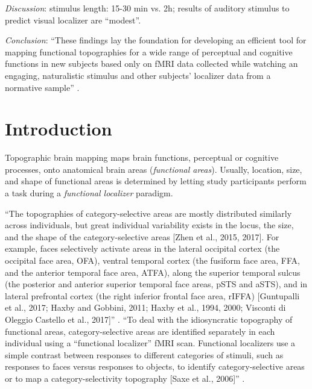 %
\textit{Discussion}: stimulus length: 15-30 min vs. 2h;  results of auditory stimulus to predict visual localizer are ``modest''.

%
\textit{Conclusion}: ``These findings lay the foundation for developing an
efficient tool for mapping functional topographies for a wide range of
perceptual and cognitive functions in new subjects based only on fMRI data
collected while watching an engaging, naturalistic stimulus and other subjects'
localizer data from a normative sample'' \citep{jiahui2020predicting}.


\section{Introduction}



Topographic brain mapping maps brain functions, perceptual or cognitive
processes, onto anatomical brain areas (\textit{functional areas}).
Usually, location, size, and shape of functional areas is determined by letting
study participants perform a task during a \textit{functional localizer}
paradigm.

``The topographies of category-selective areas are mostly distributed similarly
across individuals, but great individual variability exists in the locus, the
size, and the shape of the category-selective areas [Zhen et al., 2015, 2017].
For example, faces selectively activate areas in the lateral occipital cortex
(the occipital face area, OFA), ventral temporal cortex (the fusiform face area,
FFA, and the anterior temporal face area, ATFA), along the superior temporal
sulcus (the posterior and anterior superior temporal face areas, pSTS and aSTS),
and in lateral prefrontal cortex (the right inferior frontal face area, rIFFA)
[Guntupalli et al., 2017; Haxby and Gobbini, 2011; Haxby et al., 1994, 2000;
Visconti di Oleggio Castello et al., 2017]'' \citep{jiahui2020predicting}.
%
``To deal with the idiosyncratic topography of functional areas,
category-selective areas are identified separately in each individual using a
“functional localizer” fMRI scan.  Functional localizers use a simple contrast
between responses to different categories of stimuli, such as responses to faces
versus responses to objects, to identify category-selective areas or to map a
category-selectivity topography [Saxe et al., 2006]''
\citep{jiahui2020predicting}.

